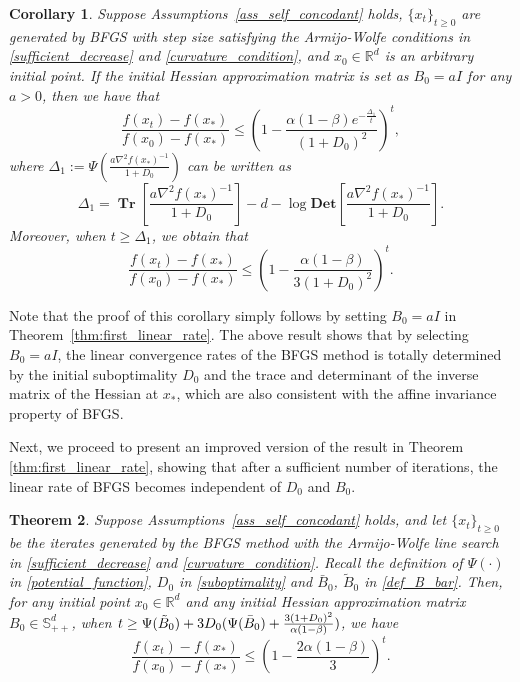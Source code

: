 \documentclass[11pt,letterpaper]{article}
\newcommand{\Det}{\mathbf{Det}}
\newcommand\0{{\Vector{0}}}
\newcommand\1{{\Vector{1}}}
\DeclareMathOperator{\Tr}{\mathbf{Tr}}
\newtheorem{theorem}{Theorem}
\newtheorem{corollary}[theorem]{Corollary}
\numberwithin{assumption}{section}
\numberwithin{definition}{section}
\numberwithin{theorem}{section}
\numberwithin{remark}{section}
\begin{document}
\begin{corollary}\label{coro:first_linear_rate}
Suppose Assumptions~\ref{ass_self_concodant} holds, $\{x_t\}_{t\geq 0}$  are generated by BFGS with step size satisfying the Armijo-Wolfe conditions in \eqref{sufficient_decrease} and \eqref{curvature_condition}, and $x_0 \in \mathbb{R}^{d}$ is an arbitrary initial point. If the initial Hessian approximation matrix is set as $B_0 = a I$ for any $a > 0$, then we have that
\begin{equation}\label{eq:first_linear_rate_a}
    \frac{f(x_t) - f(x_*)}{f(x_0) - f(x_*)} \leq \left(1 - \frac{\alpha(1 - \beta)e^{-\frac{\Delta_1}{t}}}{(1 + D_0)^2}\right)^{t},
\end{equation}
where $\Delta_1 := \Psi(\frac{a\nabla^{2}{f(x_*)^{-1}}}{1 + D_0})$ can be written as 
\begin{equation}\label{Delta_1}
\Delta_1 = \Tr\left[\frac{a\nabla^{2}{f(x_*)^{-1}}}{1 + D_0}\right] - d - \log{\Det\!\left[\frac{a\nabla^{2}{f(x_*)^{-1}}}{1 + D_0}\right]}.
\end{equation}
Moreover, when $t \geq \Delta_1$, we obtain that
\begin{equation}\label{eq:first_linear_rate_a_2}
    \frac{f(x_t) - f(x_*)}{f(x_0) - f(x_*)} \leq \left(1 - \frac{\alpha(1 - \beta)}{3(1 + D_0)^2}\right)^{t}.
\end{equation}
\end{corollary}

Note that the proof of this corollary simply follows by setting $B_0 = a I$ in Theorem~\ref{thm:first_linear_rate}. The above result shows that by selecting $B_0 = a I$, the linear convergence rates of the BFGS method is totally determined by the initial suboptimality $D_0$ and the trace and determinant of the inverse matrix of the Hessian at $x_*$, which are also consistent with the affine invariance property of BFGS.

Next, we proceed to present an improved version of the result in Theorem \ref{thm:first_linear_rate}, showing that after a sufficient number of iterations, the linear rate of BFGS becomes independent of  $D_0$ and $B_0$.

\begin{theorem}\label{thm:second_linear_rate}
Suppose Assumptions~\ref{ass_self_concodant} holds, and let $\{x_t\}_{t\geq 0}$ be the iterates generated by the BFGS method with the Armijo-Wolfe line search in \eqref{sufficient_decrease} and \eqref{curvature_condition}. Recall the definition of $\Psi(\cdot)$ in \eqref{potential_function}, $D_0$ in \eqref{suboptimality} and $\bar{B}_0$, $\tilde{B}_0$ in \eqref{def_B_bar}. Then, for any initial point $x_0 \in \mathbb{R}^{d}$ and any initial Hessian approximation matrix $B_0 \in \mathbb{S}^d_{++}$, when $
    t \geq \Psi(\Tilde{B}_{0}) + 3D_0(\Psi(\bar{B}_{0}) + \frac{3(1 + D_0)^2}{\alpha(1 - \beta)})$,
we have 
\begin{equation}\label{eq:second_linear_rate}
    \frac{f(x_t) - f(x_*)}{f(x_0) - f(x_*)} \leq \left(1 - \frac{2\alpha(1 - \beta)}{3} \right)^{t}.
\end{equation}
\end{theorem}
\end{document}
